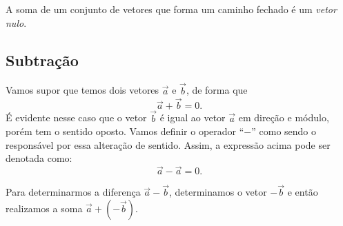 \begin{marginfigure}
\centering
{}
\caption{A soma de um conjunto de vetores que forma um caminho fechado é um \emph{vetor nulo}.\label{Fig:CaminhoFechadoVetorNulo}}
\end{marginfigure}

\subsection{Subtração}

Vamos supor que temos dois vetores $\vec{a}$ e $\vec{b}$, de forma que
\begin{equation}
    \vec{a} + \vec{b} = 0.
\end{equation}
%
É evidente nesse caso que o vetor $\vec{b}$ é igual ao vetor $\vec{a}$ em direção e módulo, porém tem o sentido oposto. Vamos definir o operador ``$-$'' como sendo o responsável por essa alteração de sentido. Assim, a expressão acima pode ser denotada como:
\begin{equation}
    \vec{a} - \vec{a} = 0.
\end{equation}

\begin{marginfigure}[-1cm]
\centering
{}
\caption{Para determinarmos a diferença $\vec{a} - \vec{b}$, determinamos o vetor $-\vec{b}$ e então realizamos a soma $\vec{a} + (-\vec{b})$.\label{Fig:DefSubtracaoVetorial}}
\end{marginfigure}

